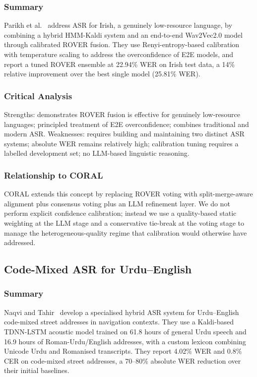 \subsubsection{Summary}
Parikh et al.~\cite{parikh2024hybrid} address ASR for Irish, a genuinely low-resource language, by combining a hybrid HMM-Kaldi system and an end-to-end Wav2Vec2.0 model through calibrated ROVER fusion. They use Renyi-entropy-based calibration with temperature scaling to address the overconfidence of E2E models, and report a tuned ROVER ensemble at 22.94\% WER on Irish test data, a 14\% relative improvement over the best single model (25.81\% WER).

\subsubsection{Critical Analysis}
Strengths: demonstrates ROVER fusion is effective for genuinely low-resource languages; principled treatment of E2E overconfidence; combines traditional and modern ASR. Weaknesses: requires building and maintaining two distinct ASR systems; absolute WER remains relatively high; calibration tuning requires a labelled development set; no LLM-based linguistic reasoning.

\subsubsection{Relationship to CORAL}
CORAL extends this concept by replacing ROVER voting with split-merge-aware alignment plus consensus voting plus an LLM refinement layer. We do not perform explicit confidence calibration; instead we use a quality-based static weighting at the LLM stage and a conservative tie-break at the voting stage to manage the heterogeneous-quality regime that calibration would otherwise have addressed.

\subsection{Code-Mixed ASR for Urdu--English}
\label{ssec:lit-naqvi}

\subsubsection{Summary}
Naqvi and Tahir~\cite{naqvi2024code} develop a specialised hybrid ASR system for Urdu--English code-mixed street addresses in navigation contexts. They use a Kaldi-based TDNN-LSTM acoustic model trained on 61.8 hours of general Urdu speech and 16.9 hours of Roman-Urdu/English addresses, with a custom lexicon combining Unicode Urdu and Romanised transcripts. They report 4.02\% WER and 0.8\% CER on code-mixed street addresses, a 70--80\% absolute WER reduction over their initial baselines.

